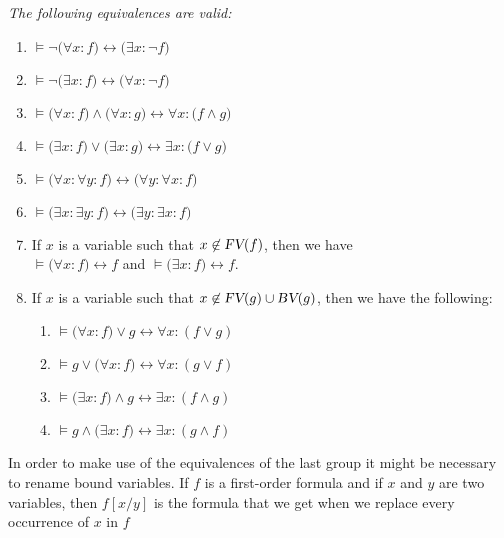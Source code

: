 \begin{Proposition}
{\em The following equivalences are valid:
  \begin{enumerate}
  \item $\models \neg\big(\forall x\colon f\big) \leftrightarrow \big(\exists x\colon \neg f\big)$
  \item $\models \neg\big(\exists x\colon f\big) \leftrightarrow \big(\forall x\colon \neg f\big)$
  \item $\models \big(\forall x\colon f\big) \wedge \big(\forall x\colon g\big) \leftrightarrow \forall x\colon \big(f \wedge g\big)$
  \item $\models \big(\exists x\colon f\big) \vee \big(\exists x\colon g\big) \leftrightarrow \exists x\colon \big(f \vee g\big)$
  \item $\models \big(\forall x\colon \forall y\colon f \big) \leftrightarrow \big(\forall y\colon  \forall x\colon f \big)$
  \item $\models \big(\exists x\colon \exists y\colon f \big) \leftrightarrow \big(\exists y\colon  \exists x\colon f \big)$
  \item If $x$ is a variable such that $x \not\in \textsl{FV}(f)$, then we have \\[0.2cm]
        \hspace*{1.3cm} $\models  \big(\forall x\colon f) \leftrightarrow f$ \quad and \quad
                        $\models  \big(\exists x\colon f) \leftrightarrow f$.
  \item If  $x$ is a variable such that $x \not\in \textsl{FV}(g) \cup \textsl{BV}(g)$, then we have the
    following:
    \begin{enumerate}
    \item $\models \big(\forall x\colon f) \vee g \leftrightarrow \forall x\colon (f \vee g)$
    \item $\models g \vee \big(\forall x\colon f) \leftrightarrow \forall x\colon (g \vee f)$
    \item $\models \big(\exists x\colon f) \wedge g \leftrightarrow \exists x\colon (f \wedge g)$
    \item $\models g \wedge \big(\exists x\colon f) \leftrightarrow \exists x\colon (g \wedge f)$
    \end{enumerate}
  \end{enumerate}
}
\end{Proposition}
In order to make use of the equivalences of the last group it might be necessary to rename
bound variables.  If $f$ is a first-order formula and if  $x$ and $y$ are two variables,
then  $f[x/y]$ is the formula that we get when we replace every occurrence of  $x$ in $f$
